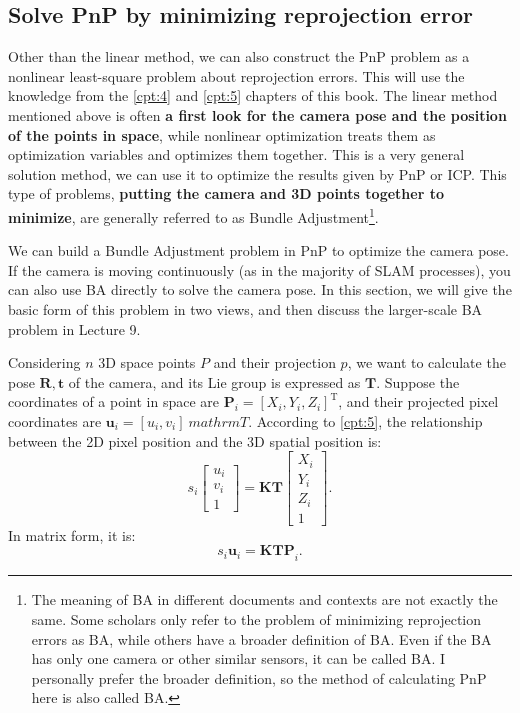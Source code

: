 \subsection{Solve PnP by minimizing reprojection error}
\label{sec:BA-vo1}
Other than the linear method, we can also construct the PnP problem as a nonlinear least-square problem about reprojection errors. This will use the knowledge from the \ref{cpt:4} and \ref{cpt:5} chapters of this book. The linear method mentioned above is often \textbf{a first look for the camera pose and the position of the points in space}, while nonlinear optimization treats them as optimization variables and optimizes them together. This is a very general solution method, we can use it to optimize the results given by PnP or ICP. This type of problems, \textbf{putting the camera and 3D points together to minimize}, are generally referred to as Bundle Adjustment\footnote{The meaning of BA in different documents and contexts are not exactly the same. Some scholars only refer to the problem of minimizing reprojection errors as BA, while others have a broader definition of BA. Even if the BA has only one camera or other similar sensors, it can be called BA. I personally prefer the broader definition, so the method of calculating PnP here is also called BA.}.

We can build a Bundle Adjustment problem in PnP to optimize the camera pose. If the camera is moving continuously (as in the majority of SLAM processes), you can also use BA directly to solve the camera pose. In this section, we will give the basic form of this problem in two views, and then discuss the larger-scale BA problem in Lecture 9.

Considering $n$ 3D space points $P$ and their projection $p$, we want to calculate the pose $\bm{R}, \bm{t}$ of the camera, and its Lie group is expressed as $\bm{T}$. Suppose the coordinates of a point in space are $\bm{P}_i=[X_i,Y_i,Z_i]^\mathrm{T}$, and their projected pixel coordinates are $\bm{u}_i=[u_i,v_i]^\ mathrm{T}$. According to \ref{cpt:5}, the relationship between the 2D pixel position and the 3D spatial position is:
\begin{equation}
s_i \left[ 
\begin{array}{l}
u_i \\ v_i \\ 1
\end{array}
\right] = \bm{K} \bm{T} \left[ 
\begin{array}{l}
X_i \\ Y_i \\ Z_i \\ 1
\end{array} \right]  .
\end{equation}
In matrix form, it is:
\[
{{s_i {\bm{u}}_i} = \bm{K} \bm{T} \bm{P}}_i.
\]

